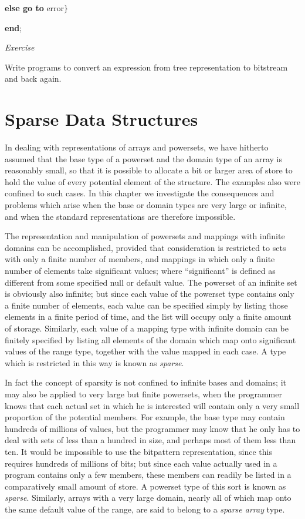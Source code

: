 \noindent
\quad \quad \textbf{else go to} error$\}$

\noindent
\quad \textbf{end};

\noindent
\textit{Exercise}
\nopagebreak

\noindent
Write programs to convert an expression from tree representation to bitstream and back again.

\section[Sparse data structures]{Sparse Data Structures}
\label{sec:sparse-data-structures}

In dealing with representations of arrays and powersets, we have hitherto assumed that the base type of a powerset and the domain type of an array is reasonably small, so that it is possible to allocate a bit or larger area of store to hold the value of every potential element of the structure. The examples also were confined to such cases. In this chapter we investigate the consequences and problems which arise when the base or domain types are very large or infinite, and when the standard representations are therefore impossible.

The representation and manipulation of powersets and mappings with infinite domains can be accomplished, provided that consideration is restricted to sets with only a finite number of members, and mappings in which only a finite number of elements take significant values; where ``significant'' is defined as different from some specified null or default value. The powerset of an infinite set is obviously also infinite; but since each value of the powerset type contains only a finite number of elements, each value can be specified simply by listing those elements in a finite period of time, and the list will occupy only a finite amount of storage. Similarly, each value of a mapping type with infinite domain can be finitely specified by listing all elements of the domain which map onto significant values of the range type, together with the value mapped in each case. A type which is restricted in this way is known as \textit{sparse}.

In fact the concept of sparsity is not confined to infinite bases and domains; it may also be applied to very large but finite powersets, when the programmer knows that each actual set in which he is interested will contain only a very small proportion of the potential members. For example, the base type may contain hundreds of millions of values, but the programmer may know that he only has to deal with sets of less than a hundred in size, and perhaps most of them less than ten. It would be impossible to use the bitpattern representation, since this requires hundreds of millions of bits; but since each value actually used in a program contains only a few members, these members can readily be listed in a comparatively small amount of store. A powerset type of this sort is known as \textit{sparse}. Similarly, arrays with a very large domain, nearly all of which map onto the same default value of the range, are said to belong to a \textit{sparse array} type.

